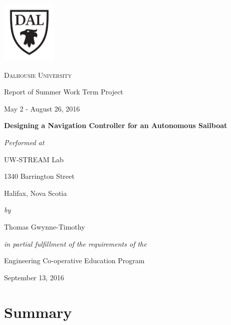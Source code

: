 \documentclass[12pt]{article}
\begin{document}
	

\begin{titlepage}
	\centering
	\includegraphics[width=0.20\textwidth]{figures/dal_logo.pdf}\par\vspace{1cm}
	{\scshape\LARGE Dalhousie University\par}
	\vspace{1cm}
	{\Large Report of Summer Work Term Project\par}
	{May 2 - August 26, 2016\par}
	\vspace{1cm}
	{\LARGE\bfseries Designing a Navigation Controller for an Autonomous Sailboat\par}
	\vfill
	{\itshape Performed at\par}
	{UW-STREAM Lab\par}
	{1340 Barrington Street\par}
	{Halifax, Nova Scotia\par}
	\vspace{0.5cm}
	{\itshape by\par}
	{\Large Thomas Gwynne-Timothy\par}
	\vspace{0.5cm}
	{\itshape in partial fulfillment of the requirements of the\par Engineering Co-operative Education Program}
	\vfill
	
	\vfill
	
	{\large September 13, 2016\par}
\end{titlepage}

\cleardoublepage

\setcounter{page}{1}

\section*{Summary}
\lipsum[1]

\cleardoublepage
\end{document}
